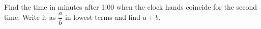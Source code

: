 Find the time in minutes after 1:00 when the clock hands coincide for the second time. Write it as $\dfrac{a}{b}$ in lowest terms and find $a+b$.
